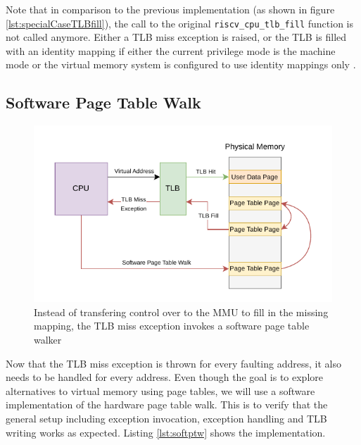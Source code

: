 Note that in comparison to the previous implementation (as shown in figure \ref{lst:specialCaseTLBfill}), the
call to the original \texttt{riscv\_cpu\_tlb\_fill} function is not called anymore.
Either a TLB miss exception is raised, or the TLB is filled with an identity mapping if either the current
privilege mode is the machine mode or the virtual memory system is configured to use identity mappings only
\cite{RISCVInstructionSet}.


\subsection{Software Page Table Walk}


\begin{figure}[ht!]
    \centering
    \includegraphics[scale=1.5]{figures/theory_sw_ptw.pdf}
    \caption[Software Page Table Walker]{Instead of transfering control over to the MMU to fill in the missing mapping,
        the TLB miss exception invokes a software page table walker}
    \label{fig:theory:sw_ptw}
\end{figure}

Now that the TLB miss exception is thrown for every faulting address, it also needs to be handled
for every address.
Even though the goal is to explore alternatives to virtual memory using page tables, we will
use a software implementation of the hardware page table walk. This is to verify that the
general setup including exception invocation, exception handling and TLB writing works as
expected.
Listing \ref{lst:softptw} shows the implementation.

